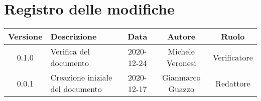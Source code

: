\section*{Registro delle modifiche}

\begin{center}
	\begin{longtable}{|c|p{5cm}|c|c|c|}
	\hline
	\rowcolor{lighter-grayer}
	\textbf{Versione} & \textbf{Descrizione} & \textbf{Data} & \textbf{Autore} & \textbf{Ruolo} \\
	\hline
	\endfirsthead


	\hline
	0.1.0 & Verifica del documento & 2020-12-24 & Michele Veronesi & Verificatore \\
	0.0.1 & Creazione iniziale del documento & 2020-12-17 & Gianmarco Guazzo & Redattore \\
	\hline

	\end{longtable}
\end{center}
